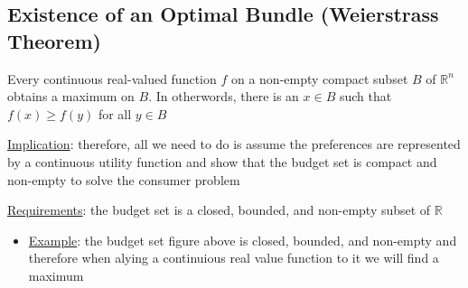 \documentclass{article}
\begin{document}
\subsection{Existence of an Optimal Bundle (Weierstrass Theorem)}
Every continuous real-valued function $f$ on a non-empty compact subset $B$ of $\mathbb{R}^{n}$ obtains a maximum on $B$. In otherwords, there is an $x \in B$ such that $f(x) \geq f(y)$ for all $y \in B$ \par \vspace{0.3em}
  \underline{Implication}: therefore, all we need to do is assume the preferences are represented by a continuous utility function and show that the budget set is compact and non-empty to solve the consumer problem \par
  \underline{Requirements}: the budget set is a closed, bounded, and non-empty subset of $\mathbb{R}$
  \begin{itemize}
    \item  \underline{Example}: the budget set figure above is closed, bounded, and non-empty and therefore when alying a continuious real value function to it we will find a maximum
  \end{itemize}
\vspace{6mm}
\end{document}
